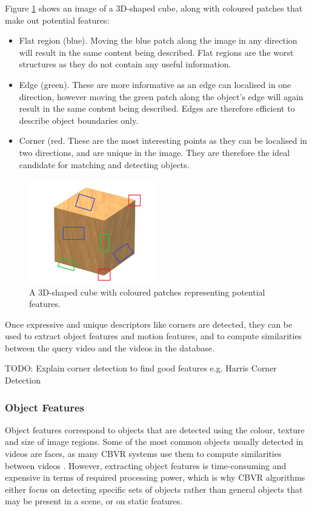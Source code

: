 Figure \ref{fig:features_cube} shows an image of a 3D-shaped cube, along with coloured patches that make out potential features:
\begin{itemize}
	\item Flat region (blue). Moving the blue patch along the image in any direction will result in the same content being described. Flat regions are the worst structures as they do not contain any useful information.
	\item Edge (green). These are more informative as an edge can localised in one direction, however moving the green patch along the object's edge will again result in the same content being described. Edges are therefore efficient to describe object boundaries only.
	\item Corner (red. These are the most interesting points as they can be localised in two directions, and are unique in the image. They are therefore the ideal candidate for matching and detecting objects.
\end{itemize}

\begin{figure}[h]
\centerline{\includegraphics[width=0.5\textwidth]{figures/features_cube.png}}
\caption{\label{fig:features_cube}A 3D-shaped cube with coloured patches representing potential features.}
\end{figure}

Once expressive and unique descriptors like corners are detected, they can be used to extract object features and motion features, and to compute similarities between the query video and the videos in the database.

TODO: Explain corner detection to find good features e.g. Harris Corner Detection

\subsubsection{Object Features}

Object features correspond to objects that are detected using the colour, texture and size of image regions. Some of the most common objects usually detected in videos are faces, as many CBVR systems use them to compute similarities between videos \cite{sivic2005face}. However, extracting object features is time-consuming and expensive in terms of required processing power, which is why CBVR algorithms either focus on detecting specific sets of objects rather than general objects that may be present in a scene, or on static features.

